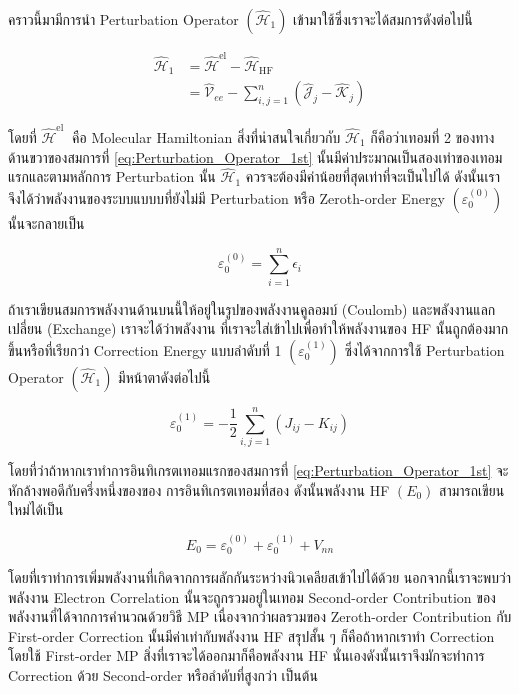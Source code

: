 คราวนี้มามีการนำ Perturbation Operator $(\hat{\mathscr{H}}_1)$ เข้ามาใช้ซึ่งเราจะได้สมการดังต่อไปนี้

\begin{equation}
    \label{eq:Perturbation_Operator_1st}
    \begin{aligned}
        \hat{\mathscr{H}}_1
         & = \hat{\mathscr{H}}^{\mathrm{el}} - \hat{\mathscr{H}}_{\mathrm{HF}} \\
         & = \hat{\mathscr{V}}_{e e} - \sum_{i, j=1}^n
        \left(
        \hat{\mathscr{J}}_j - \hat{\mathscr{K}}_j
        \right)
    \end{aligned}
\end{equation}

\noindent โดยที่ $\hat{\mathscr{H}}^{\text{el }}$ คือ Molecular Hamiltonian สิ่งที่น่าสนใจเกี่ยวกับ $\hat{\mathscr{H}}_1$
ก็คือว่าเทอมที่ 2 ของทางด้านขวาของสมการที่ \ref{eq:Perturbation_Operator_1st} นั้นมีค่าประมาณเป็นสองเท่าของเทอมแรกและตามหลักการ
Perturbation นั้น $\hat{\mathscr{H}}_1$ ควรจะต้องมีค่าน้อยที่สุดเท่าที่จะเป็นไปได้ ดังนั้นเราจึงได้ว่าพลังงานของระบบแบบบที่ยังไม่มี
Perturbation หรือ Zeroth-order Energy $(\varepsilon_{0}^{(0)})$ นั้นจะกลายเป็น

\begin{equation}
    \varepsilon_{0}^{(0)} = \sum_{i=1}^{n} \epsilon_{i}
\end{equation}

\noindent ถ้าเราเขียนสมการพลังงานด้านบนนี้ให้อยู่ในรูปของพลังงานคูลอมบ์ (Coulomb) และพลังงานแลกเปลี่ยน (Exchange) เราจะได้ว่าพลังงาน%
ที่เราจะใส่เข้าไปเพื่อทำให้พลังงานของ HF นั้นถูกต้องมากขึ้นหรือที่เรียกว่า Correction Energy แบบลำดับที่ 1 $(\varepsilon_{0}^{(1)})$
ซึ่งได้จากการใช้ Perturbation Operator $(\hat{\mathscr{H}}_1)$ มีหน้าตาดังต่อไปนี้

\begin{equation}
    \varepsilon_{0}^{(1)}
    =
    - \frac{1}{2} \sum_{i, j=1}^{n}
    \left(
    J_{i j}-K_{i j}
    \right)
\end{equation}

\noindent โดยที่ว่าถ้าหากเราทำการอินทิเกรตเทอมแรกของสมการที่ \ref{eq:Perturbation_Operator_1st} จะหักล้างพอดีกับครึ่งหนึ่งของของ%
การอินทิเกรตเทอมที่สอง ดังนั้นพลังงาน HF $(E_{0})$ สามารถเขียนใหม่ได้เป็น

\begin{equation}
    E_{0}
    =
    \varepsilon_{0}^{(0)}+\varepsilon_{0}^{(1)}+V_{n n}
\end{equation}

\noindent โดยที่เราทำการเพิ่มพลังงานที่เกิดจากการผลักกันระหว่างนิวเคลียสเข้าไปได้ด้วย นอกจากนี้เราจะพบว่าพลังงาน Electron Correlation
นั้นจะถูกรวมอยู่ในเทอม Second-order Contribution ของพลังงานที่ได้จากการคำนวณด้วยวิธี MP เนื่องจากว่าผลรวมของ Zeroth-order
Contribution กับ First-order Correction นั้นมีค่าเท่ากับพลังงาน HF สรุปสั้น ๆ ก็คือถ้าหากเราทำ Correction โดยใช้ First-order
MP สิ่งที่เราจะได้ออกมาก็คือพลังงาน HF นั่นเองดังนั้นเราจึงมักจะทำการ Correction ด้วย Second-order หรือลำดับที่สูงกว่า เป็นต้น

